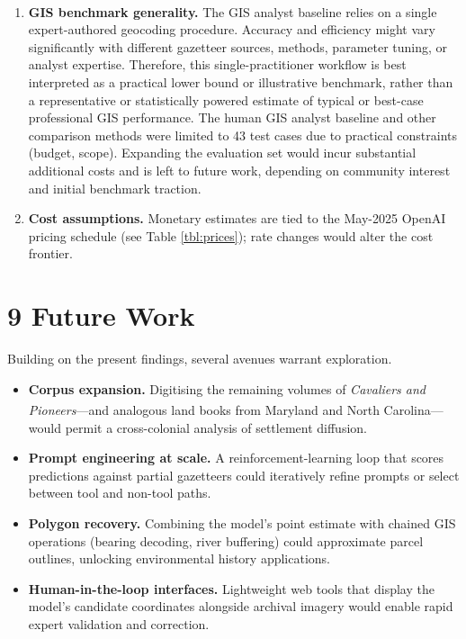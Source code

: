 \documentclass[
  10pt,
  twocolumn]{article}
\providecommand{\tightlist}{%
  \setlength{\itemsep}{0pt}\setlength{\parskip}{0pt}}
\begin{document}
\begin{enumerate}
  underlying database updates, complicating longitudinal
  reproducibility.
\item
  \textbf{GIS benchmark generality.} The GIS analyst
  baseline\textsuperscript{} relies on
  a single expert-authored geocoding procedure. Accuracy and efficiency
  might vary significantly with different gazetteer sources, methods,
  parameter tuning, or analyst expertise. Therefore, this
  single-practitioner workflow is best interpreted as a practical lower
  bound or illustrative benchmark, rather than a representative or
  statistically powered estimate of typical or best-case professional
  GIS performance. The human GIS analyst baseline and other comparison
  methods were limited to 43 test cases due to practical constraints
  (budget, scope). Expanding the evaluation set would incur substantial
  additional costs and is left to future work, depending on community
  interest and initial benchmark traction.
\item
  \textbf{Cost assumptions.} Monetary estimates are tied to the May-2025
  OpenAI pricing schedule (see Table \ref{tbl:prices}); rate changes
  would alter the cost frontier.
\end{enumerate}

\section{9 Future Work}\label{future-work}

Building on the present findings, several avenues warrant exploration.

\begin{itemize}
\tightlist
\item
  \textbf{Corpus expansion.} Digitising the remaining volumes of
  \emph{Cavaliers and
  Pioneers}\textsuperscript{}---and
  analogous land books from Maryland and North Carolina---would permit a
  cross-colonial analysis of settlement diffusion.
\item
  \textbf{Prompt engineering at scale.} A reinforcement-learning loop
  that scores predictions against partial gazetteers could iteratively
  refine prompts or select between tool and non-tool paths.
\item
  \textbf{Polygon recovery.} Combining the model's point estimate with
  chained GIS operations (bearing decoding, river buffering) could
  approximate parcel outlines, unlocking environmental history
  applications.
\item
  \textbf{Human-in-the-loop interfaces.} Lightweight web tools that
  display the model's candidate coordinates alongside archival imagery
  would enable rapid expert validation and correction.
\end{itemize}
\end{document}
